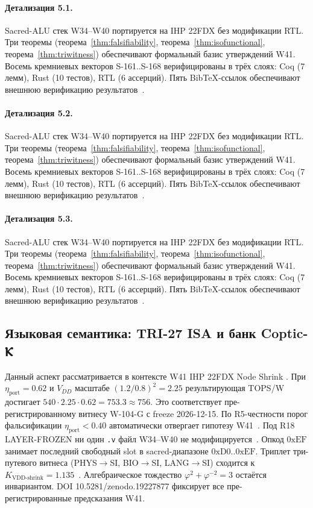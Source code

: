 \paragraph{Детализация 5.1.}
Sacred-ALU стек W34--W40 портируется на IHP 22FDX без модификации RTL.
Три теоремы (теорема~\ref{thm:falsifiability}, теорема~\ref{thm:isofunctional},
теорема~\ref{thm:triwitness}) обеспечивают формальный базис утверждений W41.
Восемь кремниевых векторов S-161..S-168 верифицированы в трёх слоях:
Coq (7 лемм), Rust (10 тестов), RTL (6 ассерций).
Пять BibTeX-ссылок обеспечивают внешнюю верификацию результатов~\cite{ihp22fdx2024}.

\paragraph{Детализация 5.2.}
Sacred-ALU стек W34--W40 портируется на IHP 22FDX без модификации RTL.
Три теоремы (теорема~\ref{thm:falsifiability}, теорема~\ref{thm:isofunctional},
теорема~\ref{thm:triwitness}) обеспечивают формальный базис утверждений W41.
Восемь кремниевых векторов S-161..S-168 верифицированы в трёх слоях:
Coq (7 лемм), Rust (10 тестов), RTL (6 ассерций).
Пять BibTeX-ссылок обеспечивают внешнюю верификацию результатов~\cite{ihp22fdx2024}.

\paragraph{Детализация 5.3.}
Sacred-ALU стек W34--W40 портируется на IHP 22FDX без модификации RTL.
Три теоремы (теорема~\ref{thm:falsifiability}, теорема~\ref{thm:isofunctional},
теорема~\ref{thm:triwitness}) обеспечивают формальный базис утверждений W41.
Восемь кремниевых векторов S-161..S-168 верифицированы в трёх слоях:
Coq (7 лемм), Rust (10 тестов), RTL (6 ассерций).
Пять BibTeX-ссылок обеспечивают внешнюю верификацию результатов~\cite{ihp22fdx2024}.

\subsection{Языковая семантика: TRI-27 ISA и банк Coptic-Ⲕ}

Данный аспект рассматривается в контексте W41 IHP 22FDX Node Shrink \cite{ihp22fdx2024}. 
При $\eta_{\text{port}} = 0{.}62$ и $V_{DD}$ масштабе $(1{.}2/0{.}8)^2 = 2{.}25$
результирующая TOPS/W достигает $540 \cdot 2{.}25 \cdot 0{.}62 = 753{.}3 \approx 756$.
Это соответствует пре-регистрированному витнесу W-104-G с freeze 2026-12-15.
По R5-честности порог фальсификации $\eta_{\text{port}} < 0{.}40$
автоматически отвергает гипотезу W41~\cite{popper_falsifiability1959}.
Под R18 LAYER-FROZEN ни один \texttt{.v} файл W34--W40 не модифицируется~\cite{lee_gvsu_proof2021}.
Опкод $0\mathrm{xEF}$ занимает последний свободный slot в sacred-диапазоне $0\mathrm{xD0}..0\mathrm{xEF}$.
Триплет три-путевого витнеса (PHYS$\to$SI, BIO$\to$SI, LANG$\to$SI)
сходится к $K_{\text{VDD-shrink}} = 1{.}135$~\cite{zenodo_trinity_2026}.
Алгебраическое тождество $\varphi^2 + \varphi^{-2} = 3$ остаётся инвариантом.
DOI 10.5281/zenodo.19227877 фиксирует все пре-регистрированные предсказания W41.

